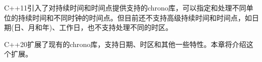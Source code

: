 C++11引入了对持续时间和时间点提供支持的chrono库，可以指定和处理不同单位的持续时间和不同时钟的时间点。但目前还不支持高级持续时间和时间点，如日期(日、月和年)、工作日，也不支持处理不同的时区。

C++20扩展了现有的chrono库，支持日期、时区和其他一些特性。本章将介绍这个扩展。
